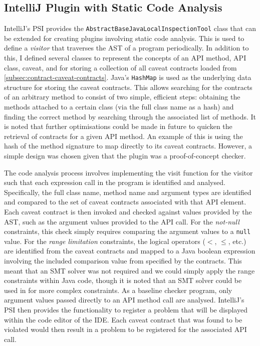 \subsection{IntelliJ Plugin with Static Code Analysis}
\label{subsec:contract-plugin}
IntelliJ's PSI provides the \lstinline{AbstractBaseJavaLocalInspectionTool} class that can be extended for creating plugins involving static code analysis. This is used to define a \textit{visitor} that traverses the AST of a program periodically. In addition to this, I defined several classes to represent the concepts of an API method, API class, caveat, and for storing a collection of all caveat contracts loaded from \ref{subsec:contract-caveat-contracts}. Java's \lstinline{HashMap} is used as the underlying data structure for storing the caveat contracts. This allows searching for the contracts of an arbitrary method to consist of two simple, efficient steps: obtaining the methods attached to a certain class (via the full class name as a hash) and finding the correct method by searching through the associated list of methods. It is noted that further optimisations could be made in future to quicken the retrieval of contracts for a given API method. An example of this is using the hash of the method signature to map directly to its caveat contracts. However, a simple design was chosen given that the plugin was a proof-of-concept checker. \bigbreak

The code analysis process involves implementing the visit function for the visitor such that each expression call in the program is identified and analysed. Specifically, the full class name, method name and argument types are identified and compared to the set of caveat contracts associated with that API element. Each caveat contract is then invoked and checked against values provided by the AST, such as the argument values provided to the API call. For the \textit{not-null} constraints, this check simply requires comparing the argument values to a \lstinline{null} value. For the \textit{range limitation} constraints, the logical operators ($<$, $\leq$, etc.) are identified from the caveat contracts and mapped to a Java boolean expression involving the included comparison value from specified by the contracts. This meant that an SMT solver was not required and we could simply apply the range constraints within Java code, though it is noted that an SMT solver could be used in for more complex constraints. As a baseline checker program, only argument values passed directly to an API method call are analysed. IntelliJ's PSI then provides the functionality to register a problem that will be displayed within the code editor of the IDE. Each caveat contract that was found to be violated would then result in a problem to be registered for the associated API call.

